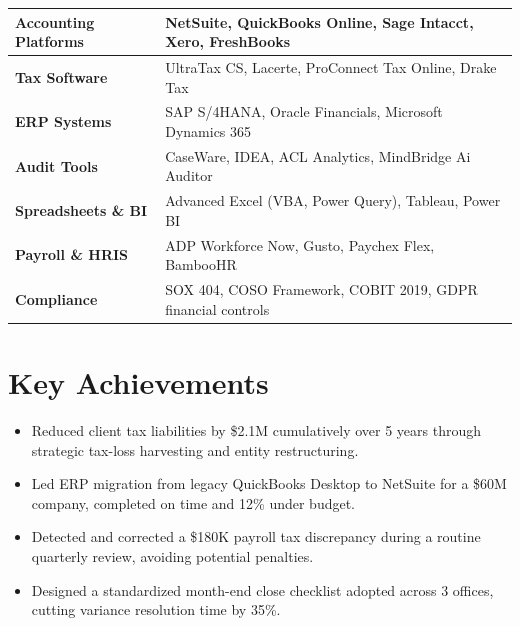 \documentclass[11pt,letterpaper]{article}
\renewcommand{\arraystretch}{1.15}
\begin{document}
\begin{center}
\renewcommand{\arraystretch}{1.35}
\begin{tabular}{@{}>{\bfseries}l l@{}}
  \toprule
  Accounting Platforms & NetSuite, QuickBooks Online, Sage Intacct, Xero, FreshBooks \\
  \midrule
  Tax Software         & UltraTax CS, Lacerte, ProConnect Tax Online, Drake Tax \\
  \midrule
  ERP Systems          & SAP S/4HANA, Oracle Financials, Microsoft Dynamics 365 \\
  \midrule
  Audit Tools          & CaseWare, IDEA, ACL Analytics, MindBridge Ai Auditor \\
  \midrule
  Spreadsheets \& BI   & Advanced Excel (VBA, Power Query), Tableau, Power BI \\
  \midrule
  Payroll \& HRIS      & ADP Workforce Now, Gusto, Paychex Flex, BambooHR \\
  \midrule
  Compliance           & SOX 404, COSO Framework, COBIT 2019, GDPR financial controls \\
  \bottomrule
\end{tabular}
\end{center}

\vspace{4pt}

\section{Key Achievements}

\begin{tcolorbox}[
  colback=lightgray,
  colframe=lightgray,
  boxrule=0pt,
  arc=4pt,
  left=10pt,
  right=10pt,
  top=8pt,
  bottom=8pt,
  boxsep=0pt,
]

\begin{minipage}[t]{0.48\textwidth}
  \raggedright
  \begin{itemize}[leftmargin=*,nosep,itemsep=3pt]
    \item Reduced client tax liabilities by \$2.1M cumulatively over 5 years through strategic tax-loss harvesting and entity restructuring.
    \item Led ERP migration from legacy QuickBooks Desktop to NetSuite for a \$60M company, completed on time and 12\% under budget.
  \end{itemize}
\end{minipage}%
\hfill
\begin{minipage}[t]{0.48\textwidth}
  \raggedright
  \begin{itemize}[leftmargin=*,nosep,itemsep=3pt]
    \item Detected and corrected a \$180K payroll tax discrepancy during a routine quarterly review, avoiding potential penalties.
    \item Designed a standardized month-end close checklist adopted across 3 offices, cutting variance resolution time by 35\%.
  \end{itemize}
\end{minipage}

\end{tcolorbox}
\end{document}
